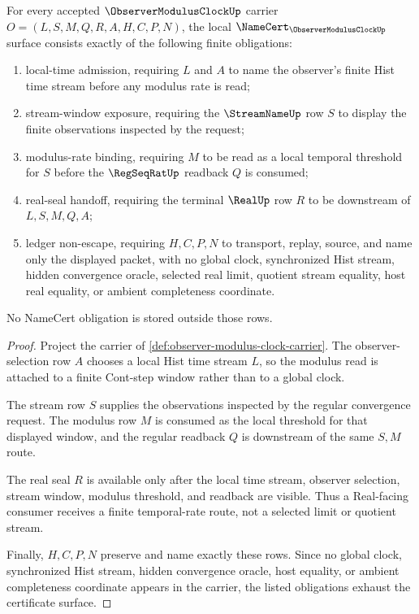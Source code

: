 \begin{theorem}
\label{thm:observer-modulus-clock-namecert-obligations}
For every accepted $\ObserverModulusClockUp$ carrier $O=(L,S,M,Q,R,A,H,C,P,N)$, the local $\NameCert_{\ObserverModulusClockUp}$ surface consists exactly of the following finite obligations:
\begin{enumerate}
\item local-time admission, requiring $L$ and $A$ to name the observer's finite Hist time stream before any modulus rate is read;
\item stream-window exposure, requiring the $\StreamNameUp$ row $S$ to display the finite observations inspected by the request;
\item modulus-rate binding, requiring $M$ to be read as a local temporal threshold for $S$ before the $\RegSeqRatUp$ readback $Q$ is consumed;
\item real-seal handoff, requiring the terminal $\RealUp$ row $R$ to be downstream of $L,S,M,Q,A$;
\item ledger non-escape, requiring $H,C,P,N$ to transport, replay, source, and name only the displayed packet, with no global clock, synchronized Hist stream, hidden convergence oracle, selected real limit, quotient stream equality, host real equality, or ambient completeness coordinate.
\end{enumerate}
No NameCert obligation is stored outside those rows.
\end{theorem}
\begin{proof}
Project the carrier of \autoref{def:observer-modulus-clock-carrier}. The observer-selection row $A$ chooses a local Hist time stream $L$, so the modulus read is attached to a finite Cont-step window rather than to a global clock.

The stream row $S$ supplies the observations inspected by the regular convergence request. The modulus row $M$ is consumed as the local threshold for that displayed window, and the regular readback $Q$ is downstream of the same $S,M$ route.

The real seal $R$ is available only after the local time stream, observer selection, stream window, modulus threshold, and readback are visible. Thus a Real-facing consumer receives a finite temporal-rate route, not a selected limit or quotient stream.

Finally, $H,C,P,N$ preserve and name exactly these rows. Since no global clock, synchronized Hist stream, hidden convergence oracle, host equality, or ambient completeness coordinate appears in the carrier, the listed obligations exhaust the certificate surface.
\end{proof}

